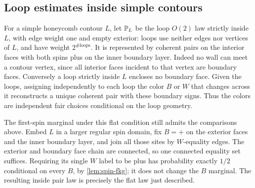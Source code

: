 \subsection{Loop estimates inside simple contours}

For a simple honeycomb contour $L$, let $\mathbb P_L$ be the loop $O(2)$ law
strictly inside $L$, with edge weight one and empty exterior: loops use
neither edges nor vertices of $L$, and have weight $2^{\#\mathrm{loops}}$.
It is represented by coherent pairs on the interior faces with both
spins plus on the inner boundary layer.  Indeed no wall can meet a
contour vertex, since all interior faces incident to that vertex are
boundary faces.  Conversely a loop strictly inside $L$ encloses no
boundary face.  Given the loops, assigning independently to each loop
the color $B$ or $W$ that changes across it reconstructs a unique coherent
pair with these boundary signs.  Thus the colors are independent fair
choices conditional on the loop geometry.

The first-spin marginal under this flat condition still admits the
comparisons above.  Embed $L$ in a larger regular spin domain, fix $B=+$
on the exterior faces and the inner boundary layer, and join all those
sites by $W$-equality edges.  The exterior and boundary face chain are
connected, so one connected equality set suffices.  Requiring its single
$W$ label to be plus has probability exactly $1/2$ conditional on every
$B$, by \cref{lem:spin-fkg}; it does not change the $B$ marginal.  The
resulting inside pair law is precisely the flat law just described.


